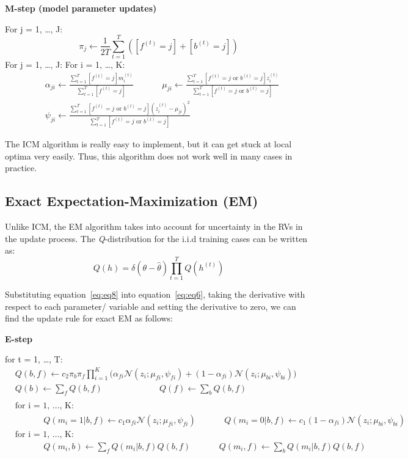 \documentclass{article} %
\begin{document}
\textbf{M-step (model parameter updates)}

For j = 1, \ldots , J: 
\begin{equation*}
\pi_j \leftarrow \frac{1}{2T}\sum_{t=1}^T([f^{(t)} = j] + [b^{(t)} = j])
\end{equation*}
For j = 1, \ldots , J: For i = 1, \ldots , K: 
\begin{align*} 
&\alpha_{ji} \leftarrow \frac{\sum_{t=1}^T [f^{(t)} = j]m_i^{(t)}}{\sum_{t=1}^T [f^{(t)} = j]} \text{ }\text{ }\text{ }\text{ }\text{ }\mu_{ji} \leftarrow \frac{\sum_{t=1}^T [f^{(t)} = j \text{ or } b^{(t)} = j ]z_i^{(t)}}{\sum_{t=1}^T [f^{(t)} = j \text{ or } b^{(t)} = j]} \\
&\psi_{ji} \leftarrow \frac{\sum_{t=1}^T [f^{(t)} = j \text{ or } b^{(t)} = j ](z_i^{(t)}-\mu_{ji})^2}{\sum_{t=1}^T [f^{(t)} = j \text{ or } b^{(t)} = j]} 
\end{align*} 

The ICM algorithm is really easy to implement, but it can get stuck at local optima very easily. Thus, this algorithm does not work well in many cases in practice.

\subsection{Exact Expectation-Maximization (EM)}
\label{exact_em}

Unlike ICM, the EM algorithm takes into account for uncertainty in the RVs in the update process. The \textit{Q}-distribution for the i.i.d training cases can be written as:
\begin{equation}
Q(h) = \delta(\theta-\hat{\theta})\prod_{t=1}^TQ(h^{(t)})
\label{eq:eq8}
\end{equation}

Substituting equation~\ref{eq:eq8} into equation~\ref{eq:eq6}, taking the derivative with respect to each parameter/ variable and setting the derivative to zero, we can find the update rule for exact EM as follows:

\textbf{E-step}

for t = 1, \ldots , T: 
\begin{align*} 
&Q(b,f) \leftarrow c_2\pi_b\pi_f\prod_{i=1}^K\Bigg(\alpha_{fi}\mathcal{N}(z_i;\mu_{fi},\psi_{fi})+ (1-\alpha_{fi})\mathcal{N}(z_i;\mu_{bi},\psi_{bi}) \Bigg) \\
&Q(b) \leftarrow \sum_{f} Q(b,f) \text{ }\text{ }\text{ }\text{ }\text{ }\text{ }\text{ }\text{ }\text{ }\text{ }Q(f) \leftarrow \sum_{b} Q(b,f) \\\\
&\text{for i = 1, \ldots , K: } \\
&\text{ }\text{ }\text{ }\text{ }\text{ }Q(m_i = 1|b,f) \leftarrow c_1\alpha_{fi}\mathcal{N}(z_i;\mu_{fi},\psi_{fi})\text{ }\text{ }\text{ }\text{ }\text{ }Q(m_i = 0|b,f) \leftarrow c_1(1-\alpha_{fi})\mathcal{N}(z_i;\mu_{bi},\psi_{bi})\\
&\text{for i = 1, \ldots , K: } \\
&\text{ }\text{ }\text{ }\text{ }\text{ }Q(m_i,b) \leftarrow \sum_{f}Q(m_i|b,f) Q(b,f)\text{ }\text{ }\text{ }\text{ }\text{ }Q(m_i,f) \leftarrow \sum_{b}Q(m_i|b,f) Q(b,f)\\
\end{align*} 
\end{document}
